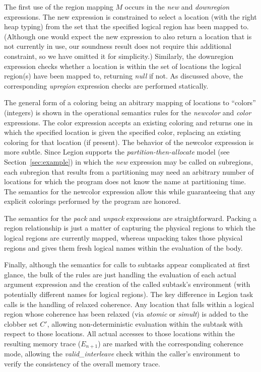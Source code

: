 The first use of the region mapping $M$ occurs in the {\em new} and {\em downregion} expressions.  The new
expression is constrained to select a location (with the right heap typing) from the set that the specified logical
region has been mapped to.  (Although one would expect the new expression to also return a location that is not
currently in use, our soundness result does not require this additional constraint, so we have omitted it for
simplicity.)  Similarly, the downregion expression checks whether a location is within the set of locations the
logical region(s) have been mapped to, returning {\em null} if not.  As discussed above, the corresponding 
{\em upregion} expression checks are performed statically.

The general form of a coloring being an abitrary mapping of locations to ``colors'' (integers) is shown in the
operational semantics rules for the {\em newcolor} and {\em color} expressions.  The color expression accepts an
existing coloring and returns one in which the specified location is given the specified color, replacing an
existing coloring for that location (if present).  The behavior of the newcolor expression is more subtle.
Since Legion supports the {\em partition-then-allocate} model (see Section~\ref{sec:example}) in which the {\em new} expression may be called
on subregions, each subregion that results from a partitioning may need an arbitrary number of locations for which
the program does not know the name at partitioning time.  The semantics for the newcolor expression allow this while
guaranteeing that any explicit colorings performed by the program are honored.

The semantics for the {\em pack} and {\em unpack} expressions are straightforward.  Packing a region relationship
is just a matter of capturing the physical regions to which the logical regions are currently mapped, whereas 
unpacking takes those physical regions and gives them fresh logical names within the evaluation of the body.

Finally, although the semantics for calls to subtasks appear complicated at first glance, the bulk of the rules
are just handling the evaluation of each actual argument expression and the creation of the called subtask's 
environment (with potentially different names for logical regions).  The key difference in Legion task calls is the
handling of relaxed coherence.  Any location that falls within
a logical region whose coherence has been relaxed (via {\em atomic} or {\em simult}) is added to the clobber set
$C'$, allowing non-deterministic evaluation within the subtask with respect to those locations.  All actual accesses
to those locations within the resulting memory trace ($E_{n+1}$) are marked with the corresponding coherence mode,
allowing the {\em valid\_interleave} check within the caller's environment to verify the consistency of the overall
memory trace.

